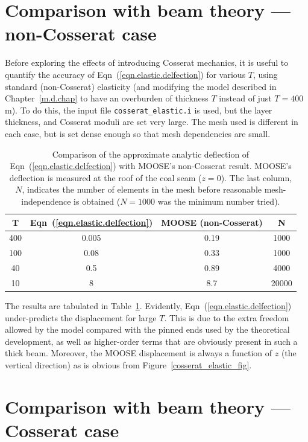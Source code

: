 \documentclass[]{scrreprt}
\begin{document}
\section{Comparison with beam theory --- non-Cosserat case}

Before
exploring the effects of introducing Cosserat mechanics, it is useful
to quantify the accuracy of Eqn~(\ref{eqn.elastic.delfection}) for
various $T$, using standard (non-Cosserat) elasticity (and modifying
the model described in Chapter~\ref{m.d.chap} to have an overburden of
thickness $T$ instead of just $T=400$\,m).    To do this,
the input file {\tt cosserat\_elastic.i} is used, but the layer
thickness, and Cosserat moduli are set very large.  The mesh used is
different in each case, but is set dense enough so that mesh
dependencies are small.

\begin{table}[htb]
\begin{center}
\begin{tabular}{cccc}
  T & Eqn~(\ref{eqn.elastic.delfection}) & MOOSE (non-Cosserat) & N \\
  \hline
  400 & 0.005 & 0.19 & 1000 \\
  100 & 0.08 & 0.33 & 1000 \\
  40 & 0.5 & 0.89 & 4000 \\
  10 & 8 & 8.7 & 20000\\
\end{tabular}
\caption{Comparison of the approximate analytic deflection of
  Eqn~(\ref{eqn.elastic.delfection}) with MOOSE's non-Cosserat
  result.  MOOSE's deflection is measured at the roof of the coal seam
  ($z=0$).  The last column, $N$, indicates the number of elements in
  the mesh before reasonable mesh-independence is obtained  ($N=1000$ was the
  minimum number tried).}
\label{elastic.deform.standard}
\end{center}
\end{table}

The results are tabulated in Table~\ref{elastic.deform.standard}.
Evidently, Eqn~(\ref{eqn.elastic.delfection}) under-predicts the
displacement for large $T$.  This is due to the extra freedom allowed
by the model compared with the pinned ends used by the theoretical
development, as well as higher-order terms that are obviously present
in such a thick beam.  Moreover, the MOOSE displacement is always a
function of $z$ (the vertical direction) as is obvious from
Figure~\ref{cosserat_elastic_fig}.

\section{Comparison with beam theory --- Cosserat case}
\end{document}

